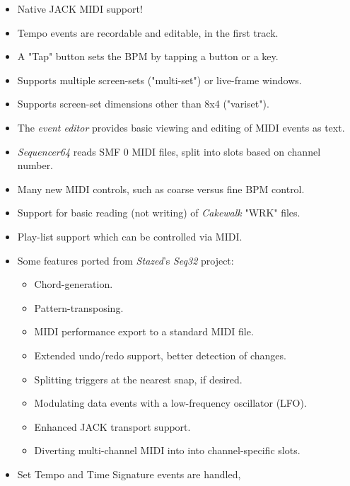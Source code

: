 \documentclass[
 11pt,
 twoside,
 a4paper,
 headinclude,
 footinclude,
 final                                 %
]{article}
\begin{document}
   \begin{itemize}
      \item Native JACK MIDI support!
      \item Tempo events are recordable and editable, in the first track.
      \item A "Tap" button sets the BPM by tapping a button or a key.
      \item Supports multiple screen-sets ("multi-set") or
         live-frame windows.
      \item Supports screen-set dimensions other than 8x4 ("variset").
      \item The \textsl{event editor}
         provides basic viewing and editing of MIDI events as text.
      \item \textsl{Sequencer64} reads SMF 0 MIDI files, split
         into slots based on channel number.
      \item Many new MIDI controls, such as coarse versus fine BPM control.
      \item Support for basic reading (not writing) of
         \textsl{Cakewalk} "WRK" files.
      \item Play-list support which can be controlled via MIDI.
      \item Some features ported from \textsl{Stazed}'s
         \textsl{Seq32} \cite{seq32} project:
         \begin{itemize}
            \item Chord-generation.
            \item Pattern-transposing.
            \item MIDI performance export to a standard MIDI file.
            \item Extended undo/redo support, better detection of changes.
            \item Splitting triggers at the nearest snap, if desired.
            \item Modulating data events with a low-frequency oscillator (LFO).
            \item Enhanced JACK transport support.
            \item Diverting multi-channel MIDI into into channel-specific slots.
         \end{itemize}
      \item Set Tempo and Time Signature events are handled,

\end{itemize}
\end{document}
